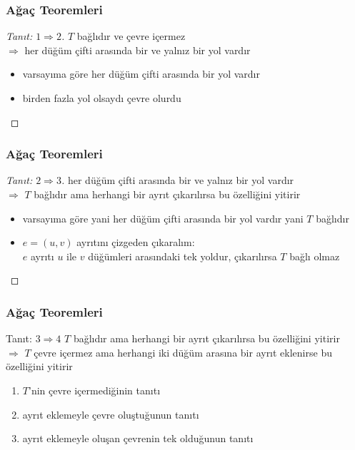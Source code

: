\documentclass[dvipsnames]{beamer}
\theoremstyle{definition}
\theoremstyle{example}
\theoremstyle{plain}
\begin{document}
\begin{frame}
  \frametitle{Ağaç Teoremleri}

  \begin{proof}[Tanıt: $1 \Rightarrow 2$]
    $T$ bağlıdır ve çevre içermez\\
    $\Rightarrow$ her düğüm çifti arasında bir ve yalnız bir yol vardır

    \pause
    \begin{itemize}
      \item varsayıma göre her düğüm çifti arasında bir yol vardır
      \item birden fazla yol olsaydı çevre olurdu
    \end{itemize}
  \end{proof}
\end{frame}

\begin{frame}
  \frametitle{Ağaç Teoremleri}

  \begin{proof}[Tanıt: $2 \Rightarrow 3$]
    her düğüm çifti arasında bir ve yalnız bir yol vardır\\
    $\Rightarrow$ $T$ bağlıdır ama herhangi bir ayrıt çıkarılırsa bu özelliğini
    yitirir

    \pause
    \begin{itemize}
      \item varsayıma göre yani her düğüm çifti arasında bir yol vardır yani
        $T$ bağlıdır

      \pause
      \item $e = (u,v)$ ayrıtını çizgeden çıkaralım:\\
        $e$ ayrıtı $u$ ile $v$ düğümleri arasındaki tek yoldur, çıkarılırsa $T$
        bağlı olmaz
    \end{itemize}
  \end{proof}
\end{frame}

\begin{frame}
  \frametitle{Ağaç Teoremleri}

  \begin{block}{Tanıt: $3 \Rightarrow 4$}
    $T$ bağlıdır ama herhangi bir ayrıt çıkarılırsa bu özelliğini yitirir\\
    $\Rightarrow$ $T$ çevre içermez ama herhangi iki düğüm arasına bir ayrıt
    eklenirse bu özelliğini yitirir

    \pause
    \begin{enumerate}
      \item $T$'nin çevre içermediğinin tanıtı
      \item ayrıt eklemeyle çevre oluştuğunun tanıtı
      \item ayrıt eklemeyle oluşan çevrenin tek olduğunun tanıtı
    \end{enumerate}
  \end{block}
\end{frame}
\end{document}

